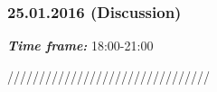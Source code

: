 \subsubsection{25.01.2016 (Discussion)}
\textit{\textbf{Time frame:}} 18:00-21:00 \newline

////////////////////////////////